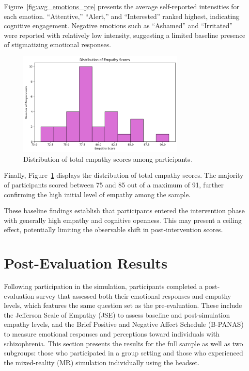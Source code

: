 Figure~\ref{fig:avg_emotions_pre} presents the average self-reported intensities for each emotion. “Attentive,” “Alert,” and “Interested” ranked highest, indicating cognitive engagement. Negative emotions such as “Ashamed” and “Irritated” were reported with relatively low intensity, suggesting a limited baseline presence of stigmatizing emotional responses.

\begin{figure}[H]
    \centering
    \includegraphics[width=0.75\textwidth]{../../Figures/avg-scores-summary-pre.png}
    \caption{Distribution of total empathy scores among participants.}
    \label{fig:score_distribution_pre}
\end{figure}

Finally, Figure~\ref{fig:score_distribution_pre} displays the distribution of total empathy scores. The majority of participants scored between 75 and 85 out of a maximum of 91, further confirming the high initial level of empathy among the sample.

These baseline findings establish that participants entered the intervention phase with generally high empathy and cognitive openness. This may present a ceiling effect, potentially limiting the observable shift in post-intervention scores.

\section{Post-Evaluation Results}

Following participation in the simulation, participants completed a post-evaluation survey that assessed both their emotional responses and empathy levels, which features the same question set as the pre-evaluation. These include the Jefferson Scale of Empathy (JSE) \cite{Hojat2002} to assess baseline and post-simulation empathy levels, and the Brief Positive and Negative Affect Schedule (B-PANAS) \cite{Boiroux2024} to measure emotional responses and perceptions toward individuals with schizophrenia. This section presents the results for the full sample as well as two subgroups: those who participated in a group setting and those who experienced the mixed-reality (MR) simulation individually using the headset.

